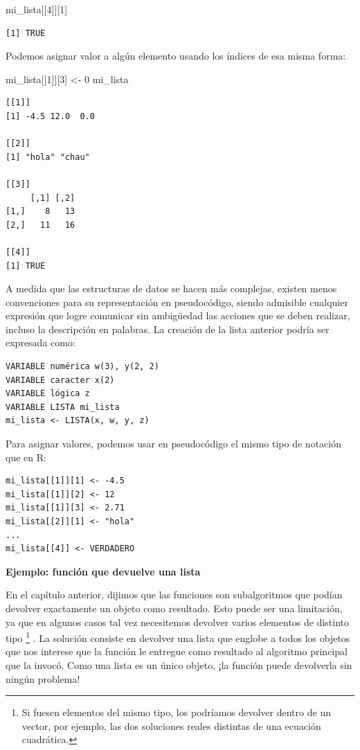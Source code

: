 \documentclass[
]{book}
\newenvironment{Shaded}{\begin{snugshade}}{\end{snugshade}}
\newcommand{\DecValTok}[1]{\textcolor[rgb]{0.00,0.00,0.81}{#1}}
\newcommand{\NormalTok}[1]{#1}
\newcommand{\OtherTok}[1]{\textcolor[rgb]{0.56,0.35,0.01}{#1}}
\begin{document}
\begin{Shaded}
\begin{Highlighting}[]
\NormalTok{mi\_lista[[}\DecValTok{4}\NormalTok{]][}\DecValTok{1}\NormalTok{]}
\end{Highlighting}
\end{Shaded}

\begin{verbatim}
[1] TRUE
\end{verbatim}

Podemos asignar valor a algún elemento usando los índices de esa misma forma:

\begin{Shaded}
\begin{Highlighting}[]
\NormalTok{mi\_lista[[}\DecValTok{1}\NormalTok{]][}\DecValTok{3}\NormalTok{] }\OtherTok{\textless{}{-}} \DecValTok{0}
\NormalTok{mi\_lista}
\end{Highlighting}
\end{Shaded}

\begin{verbatim}
[[1]]
[1] -4.5 12.0  0.0

[[2]]
[1] "hola" "chau"

[[3]]
     [,1] [,2]
[1,]    8   13
[2,]   11   16

[[4]]
[1] TRUE
\end{verbatim}

A medida que las estructuras de datos se hacen más complejas, existen menos convenciones para su representación en pseudocódigo, siendo admisible cualquier expresión que logre comunicar sin ambigüedad las acciones que se deben realizar, incluso la descripción en palabras. La creación de la lista anterior podría ser expresada como:

\begin{verbatim}
VARIABLE numérica w(3), y(2, 2)
VARIABLE caracter x(2)
VARIABLE lógica z
VARIABLE LISTA mi_lista
mi_lista <- LISTA(x, w, y, z)
\end{verbatim}

Para asignar valores, podemos usar en pseudocódigo el mismo tipo de notación que en R:

\begin{verbatim}
mi_lista[[1]][1] <- -4.5
mi_lista[[1]][2] <- 12
mi_lista[[1]][3] <- 2.71
mi_lista[[2]][1] <- "hola"
...
mi_lista[[4]] <- VERDADERO
\end{verbatim}

\textbf{Ejemplo: función que devuelve una lista}

En el capítulo anterior, dijimos que las funciones son subalgoritmos que podían devolver exactamente un objeto como resultado. Esto puede ser una limitación, ya que en algunos casos tal vez necesitemos devolver varios elementos de distinto tipo
\footnote{Si fuesen elementos del mismo tipo, los podríamos devolver dentro de un vector, por ejemplo, las dos soluciones reales distintas de una ecuación cuadrática.}
.
La solución consiste en devolver una lista que englobe a todos los objetos que nos interese que la función le entregue como resultado al algoritmo principal que la invocó. Como una lista es un único objeto, ¡la función puede devolverla sin ningún problema!
\end{document}
